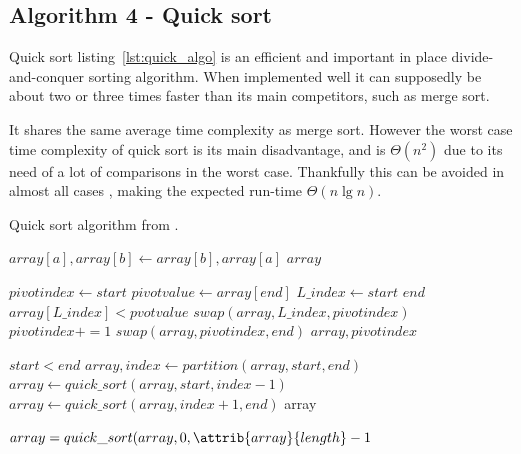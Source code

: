 \documentclass[sigconf, nonacm, natbib, screen, balance=False]{acmart}
\begin{document}
\subsection{Algorithm 4 - Quick sort}\label{sec:algo4}

Quick sort listing~\ref{lst:quick_algo} is an efficient and important in place divide-and-conquer sorting algorithm. When implemented well it can supposedly be about two or three times faster than its main competitors, such as merge sort. 

It shares the same average time complexity as merge sort. However the worst case time complexity of quick sort is its main disadvantage, and is $\Theta(n^2)$ due to its need of a lot of comparisons in the worst case. Thankfully this can be avoided in almost all cases , making the expected run-time $\Theta(n\lg n)$. 

\begin{listing}
  \caption{Quick sort algorithm from \citet[Ch.~2.1]{CLRS_2009}.}
  \label{lst:quick_algo}
  
  \begin{codebox}
    \li $array[a], array[b] \gets array[b], array[a]$
    \li \Return $array$
  \end{codebox}

  \begin{codebox}
    \li $pivotindex \gets start$
    \li $pivotvalue \gets array[end]$
    \li \For $L\_index \gets start$ \To $end$ 
    \li \Do
    \If $array[L\_index] < pvotvalue$
    \li \Do
    $swap(array, L\_index, pivotindex)$
    \li $pivotindex += 1$
    \End
    \End
    \li $swap(array, pivotindex, end)$
    \li \Return $array, pivotindex$

  \end{codebox}

  \begin{codebox}
    \li \If $start < end$
    \li \Do
    $array, index \gets partition(array, start, end)$
    \li $array \gets quick\_sort(array, start, index-1)$
    \li $array \gets quick\_sort(array, index+1, end)$
    \li \Return array
  \end{codebox}

  \begin{codebox}
    \li $array = quick\_sort(array, 0, \attrib{array}{length} - 1$

  \end{codebox}

\end{listing}
\end{document}
